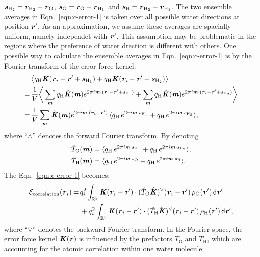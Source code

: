 \documentclass[aps,pre,preprint]{revtex4}
\renewcommand{\v}[1]{\textbf{\textit{#1}}}
\renewcommand{\d}[1]{\textsf{#1}}
\begin{document}
$\v s_{\textrm{H}_2} = \v r_{\textrm{H}_2} - \v r_{\textrm{O}}$,
$\v s_{\textrm{O}} = \v r_{\textrm{O}} - \v r_{\textrm{H}_1}$ and
$\v s_{\textrm{H}} = \v r_{\textrm{H}_2} - \v r_{\textrm{H}_1}$.
The two ensemble averages in Eqn.~\eqref{eqn:c-error-1}
is taken over all possible water directions 
at position $\v r'$. As an approximation, we
assume these averages are  spacially uniform, namely independet with $\v r'$.
This assumption may be  problematic
in the regions where the preference of water  drection is different
with others.
One possible way to calculate the ensemble averages in
Eqn.~\eqref{eqn:c-error-1} is by the Fourier transform
of the error force kernel:
\begin{align} \nonumber
  &\big\langle
  q_{\textrm{H}}\v K(\v r_i - \v r' + \v s_{\textrm{H}_1})+
  q_{\textrm{H}}\v K(\v r_i - \v r' + \v s_{\textrm{H}_2})
  \big\rangle \\ \nonumber
  =\,&
  \frac1V\bigg\langle
  \sum_{\v m}
  q_{\textrm{H}}\hat{\v K}(\v m)
  e^{2\pi i\v m\cdot(\v r_i - \v r' + \v s_{\textrm{H}_1})} +
  \sum_{\v m}
  q_{\textrm{H}}\hat{\v K}(\v m)
  e^{2\pi i\v m\cdot(\v r_i - \v r' + \v s_{\textrm{H}_2})}
  \bigg\rangle \\\nonumber
  =\,&
  \frac1V\sum_{\v m}
  \hat{\v K}(\v m)
  e^{2\pi i\v m\cdot(\v r_i - \v r')}
  \,  
  \langle
  q_{\textrm{H}}\,e^{2\pi i\v m\cdot\v s_{\textrm{H}_1}} +
  q_{\textrm{H}}\,e^{2\pi i\v m\cdot\v s_{\textrm{H}_2}}
  \rangle,
\end{align}
where ``$\wedge$'' denotes the forward Fourier transform. By denoting
\begin{align}
  \hat T_{\textrm{O}}(\v m)
  &= 
  \langle
  q_{\textrm{H}}\,e^{2\pi i\v m\cdot\v s_{\textrm{H}_1}} +
  q_{\textrm{H}}\,e^{2\pi i\v m\cdot\v s_{\textrm{H}_2}}
  \rangle,\\
  \hat T_{\textrm{H}}(\v m)
  &= 
  \langle
  q_{\textrm{O}}\,e^{2\pi i\v m\cdot\v s_{\textrm{O}}} +
  q_{\textrm{H}}\,e^{2\pi i\v m\cdot\v s_{\textrm{H}}}
  \rangle.
\end{align}
The Eqn.~\eqref{eqn:c-error-1} becomes:
\begin{align}\nonumber
  \mathcal E_{\textrm{correlation}}(\v r_i)
  =&\,
  q_i^2
  \int_{\mathbb R^3}
  \v K(\v r_i - \v r')\cdot
  (\hat T_{\textrm{O}}\hat{\v K})^{\vee}(\v r_i - \v r')
  \,\rho_{\textrm{O}}(\v r')
  \,\d d\v r' \\\label{eqn:c-error-water}
  & \,+
  q_i^2
  \int_{\mathbb R^3}
  \v K(\v r_i - \v r')\cdot
  (\hat T_{\textrm{H}}\hat{\v K})^{\vee}(\v r_i - \v r')
  \,\rho_{\textrm{H}}(\v r')
  \,\d d\v r',
\end{align}
where ``$\vee$'' denotes the backward Fourier transform.
In the Fourier space, the error force kernel $\v K(\v r)$ is
influenced by the prefactors $T_{\textrm{O}}$ and $T_{\textrm{H}}$,
which are accounting for the atomic correlation within one water
molecule.
\end{document}
